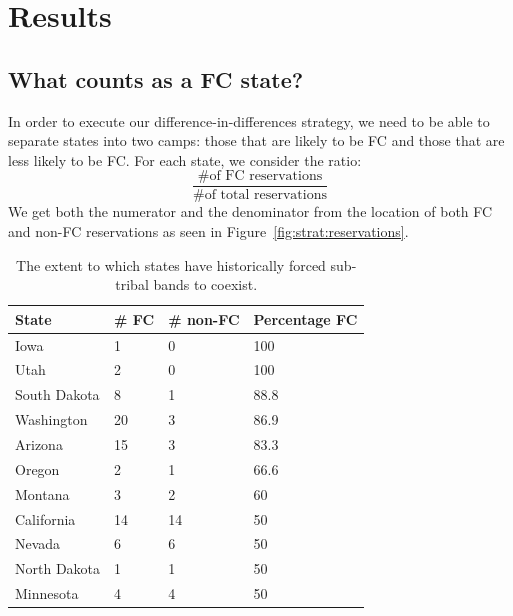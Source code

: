 \documentclass[12pt]{article}
\begin{document}
\section{Results}

\subsection{What counts as a FC state?}
In order to execute our difference-in-differences strategy, we need to be able to separate states into two camps: those that are likely to be FC and those that are less likely to be FC. For each state, we consider the ratio:
$$\frac{\mbox{\# of FC reservations}}{\mbox{\# of total reservations}}$$
We get both the numerator and the denominator from the location of both FC and non-FC reservations as seen in Figure~\ref{fig:strat:reservations}.


\begin{table}[ht!]
	\centering
    \begin{tabular}{ | l | l | l | l | }\hline\hline
    State        & \# FC & \# non-FC & Percentage FC \\\hline
	Iowa         & 1     & 0         & 100           \\
	Utah         & 2     & 0         & 100           \\
    South Dakota & 8     & 1         & 88.8          \\
	Washington   & 20    & 3         & 86.9          \\
    Arizona      & 15    & 3         & 83.3          \\
	Oregon       & 2     & 1         & 66.6          \\
    Montana      & 3     & 2         & 60            \\
    California   & 14    & 14        & 50            \\
    Nevada       & 6     & 6         & 50            \\
    North Dakota & 1     & 1         & 50            \\
    Minnesota    & 4     & 4         & 50            \\\hline
    \end{tabular}
    \caption{The extent to which states have historically forced sub-tribal bands to coexist.}
    \label{fcpercent}
\end{table}
\end{document}
